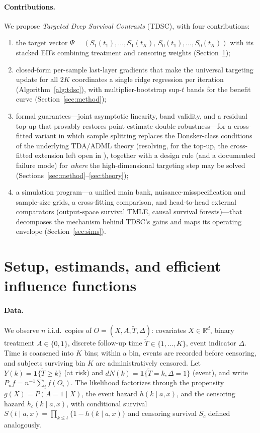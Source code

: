 \documentclass[11pt]{article}
\theoremstyle{remark}
\newcommand{\Pn}{P_n}
\newcommand{\ind}{\mathbf{1}}
\begin{document}
\paragraph{Contributions.} We propose \emph{Targeted Deep Survival Contrasts} (TDSC), with four contributions:
\begin{enumerate}
\item the target vector $\Psi = (S_1(t_1),\dots,S_1(t_K),\allowbreak\, S_0(t_1),\dots,S_0(t_K))$ with its stacked EIFs combining treatment and censoring weights (Section~\ref{sec:setup});
\item closed-form per-sample last-layer gradients that make the universal targeting update for all $2K$ coordinates a single ridge regression per iteration (Algorithm~\ref{alg:tdsc}), with multiplier-bootstrap sup-$t$ bands for the benefit curve (Section~\ref{sec:method});
\item formal guarantees---joint asymptotic linearity, band validity, and a residual top-up that provably restores point-estimate double robustness---for a cross-fitted variant in which sample splitting replaces the Donsker-class conditions of the underlying TDA/ADML theory (resolving, for the top-up, the cross-fitted extension left open in \citealp{li2025tda}), together with a design rule (and a documented failure mode) for \emph{where} the high-dimensional targeting step may be solved (Sections~\ref{sec:method}--\ref{sec:theory});
\item a simulation program---a unified main bank, nuisance-misspecification and sample-size grids, a cross-fitting comparison, and head-to-head external comparators (output-space survival TMLE, causal survival forests)---that decomposes the mechanism behind TDSC's gains and maps its operating envelope (Section~\ref{sec:sims}).
\end{enumerate}

\section{Setup, estimands, and efficient influence functions}\label{sec:setup}

\paragraph{Data.} We observe $n$ i.i.d.\ copies of $O=(X, A, \tilde T, \Delta)$: covariates $X\in\mathbb{R}^d$, binary treatment $A\in\{0,1\}$, discrete follow-up time $\tilde T\in\{1,\dots,K\}$, event indicator $\Delta$. Time is coarsened into $K$ bins; within a bin, events are recorded before censoring, and subjects surviving bin $K$ are administratively censored. Let $Y(k)=\ind\{\tilde T\ge k\}$ (at risk) and $dN(k)=\ind\{\tilde T=k,\Delta=1\}$ (event), and write $\Pn f = n^{-1}\sum_i f(O_i)$. The likelihood factorizes through the propensity $g(X)=P(A=1\mid X)$, the event hazard $h(k\mid a,x)$, and the censoring hazard $h_c(k\mid a,x)$, with conditional survival $S(t\mid a,x)=\prod_{k\le t}\{1-h(k\mid a,x)\}$ and censoring survival $S_c$ defined analogously.
\end{document}
